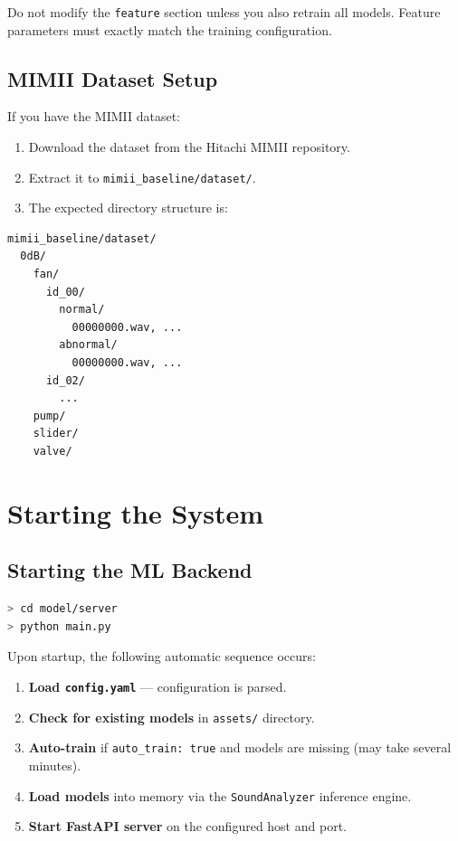 \documentclass[10pt, a4paper, oneside]{report}
\begin{document}
\begin{warningbox}
Do not modify the \texttt{feature} section unless you also retrain all models. Feature parameters must exactly match the training configuration.
\end{warningbox}

\subsection{MIMII Dataset Setup}
\label{subsec:dataset}

If you have the MIMII dataset:
\begin{enumerate}[leftmargin=*, nosep]
  \item Download the dataset from the Hitachi MIMII repository.
  \item Extract it to \texttt{mimii\_baseline/dataset/}.
  \item The expected directory structure is:
\end{enumerate}

\begin{lstlisting}[caption={MIMII Dataset directory structure}]
mimii_baseline/dataset/
  0dB/
    fan/
      id_00/
        normal/
          00000000.wav, ...
        abnormal/
          00000000.wav, ...
      id_02/
        ...
    pump/
    slider/
    valve/
\end{lstlisting}

\section{Starting the System}
\label{sec:starting}

\subsection{Starting the ML Backend}

\begin{lstlisting}[language=bash, caption={Start ML backend}]
> cd model/server
> python main.py
\end{lstlisting}

Upon startup, the following automatic sequence occurs:
\begin{enumerate}[leftmargin=*, nosep]
  \item \textbf{Load \texttt{config.yaml}} --- configuration is parsed.
  \item \textbf{Check for existing models} in \texttt{assets/} directory.
  \item \textbf{Auto-train} if \texttt{auto\_train: true} and models are missing (may take several minutes).
  \item \textbf{Load models} into memory via the \texttt{SoundAnalyzer} inference engine.
  \item \textbf{Start FastAPI server} on the configured host and port.
\end{enumerate}
\end{document}
